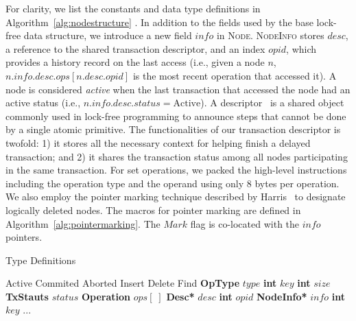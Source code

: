 \documentclass[]{sig-alternate-05-2015}
\begin{document}
For clarity, we list the constants and data type definitions in Algorithm~\ref{alg:nodestructure} .
In addition to the fields used by the base lock-free data structure, we introduce a new field $info$ in \textsc{Node}.
\textsc{NodeInfo} stores $desc$, a reference to the shared transaction descriptor, and an index $opid$, which provides a history record on the last access (i.e., given a node $n$, $n.info.desc.ops[n.desc.opid]$ is the most recent operation that accessed it).
A node is considered \emph{active} when the last transaction that accessed the node had an active status (i.e., $n.info.desc.status=\text{Active}$).
A descriptor~\cite{herlihy2012art} is a shared object commonly used in lock-free programming to announce steps that cannot be done by a single atomic primitive.
The functionalities of our transaction descriptor is twofold: 1) it stores all the necessary context for helping finish a delayed transaction; and 2) it shares the transaction status among all nodes participating in the same transaction.
For set operations, we packed the high-level instructions including the operation type and the operand using only 8 bytes per operation.
We also employ the pointer marking technique described by Harris~\cite{harris2001pragmatic} to designate logically deleted nodes. 
The macros for pointer marking are defined in Algorithm~\ref{alg:pointermarking}.
The $Mark$ flag is co-located with the $info$ pointers.

\vspace{-0.1in}
\begin{algorithm}[h]
    \caption{Type Definitions}
    \label{alg:nodestructure}
    \vspace{-0.2in}
    \begin{multicols}{2}
        \begin{algorithmic}[1]
            \State Active
            \State Commited
            \State Aborted
            \EndEnum
            \State Insert
            \State Delete
            \State Find
            \EndEnum
            \State \textbf{OpType} $type$
            \State \textbf{int} $key$
            \EndStruct
            \State \textbf{int} $size$
            \State \textbf{TxStauts} $status$
            \State \textbf{Operation} $ops[\;]$
            \EndStruct
            \State \textbf{Desc*} $desc$
            \State \textbf{int} $opid$
            \EndStruct
            \State \textbf{NodeInfo*} $info$
            \State \textbf{int} $key$
            \State ...
            \EndStruct
            \end{algorithmic}
    \end{multicols}
    \vspace{-0.15in}
\end{algorithm}
\end{document}
